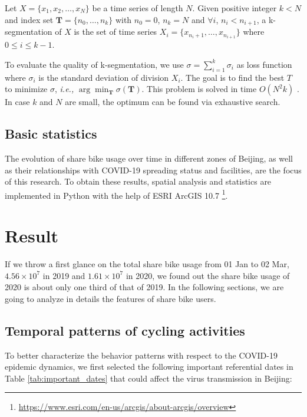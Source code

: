 \documentclass[ijgi,submit,moreauthors,pdftex]{Definitions/mdpi}
\begin{document}
\begin{Definition}[k-segmentation]\label{def:k-seg}
Let $X=\{x_1,x_2,\ldots,x_N\}$ be a time series of length $N$.
Given positive integer $k<N$ and index set $\mathbf{T}=\{n_0,\ldots,n_k\}$ with $n_0=0$, $n_k=N$ and $\forall i$, $n_i<n_{i+1}$, a k-segmentation of $X$ is the set of time series $X_i=\{x_{n_i+1},\ldots,x_{n_{i+1}}\}$ where $0\leq i\leq k-1$.
\end{Definition}

To evaluate the quality of k-segmentation, we use $\sigma=\sum_{i=1}^{k}{\sigma_i}$ as loss function where $\sigma_i$ is the standard deviation of division $X_i$. 
The goal is to find the best $T$ to minimize $\sigma$, \textit{i.e.,} $\arg\min_{\mathbf{T}}\sigma(\mathbf{T})$.
This problem is solved in time $O(N^2k)$ \cite{terzi2006efficient}.
In case $k$ and $N$ are small, the optimum can be found via exhaustive search.

\subsection{Basic statistics}
The evolution of share bike usage over time in different zones of Beijing, as well as their relationships with COVID-19 spreading status and facilities, are the focus of this research.
To obtain these results, spatial analysis and statistics are implemented in Python with the help of ESRI ArcGIS 10.7 \footnote{\url{https://www.esri.com/en-us/arcgis/about-arcgis/overview}}. 

\section{Result}

If we throw a first glance on the total share bike usage from 01 Jan to 02 Mar, $4.56\times10^7$ in 2019 and $1.61\times10^7$ in 2020, we found out the share bike usage of 2020 is about only one third of that of 2019.
In the following sections, we are going to analyze in details the features of share bike users.

\subsection{Temporal patterns of cycling activities}
To better characterize the behavior patterns with respect to the COVID-19 epidemic dynamics, we first selected the following important referential dates in Table \ref{tab:important_dates} that could affect the virus transmission in Beijing: 
\end{document}
